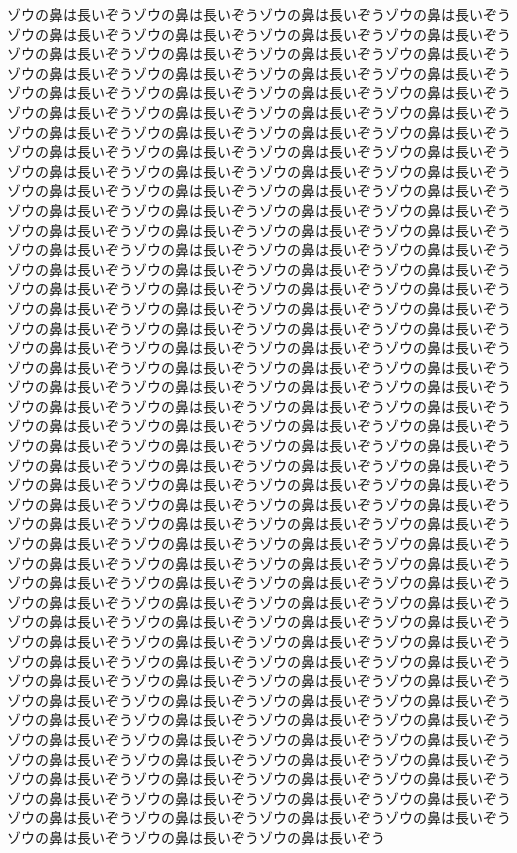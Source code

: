 ゾウの鼻は長いぞうゾウの鼻は長いぞうゾウの鼻は長いぞうゾウの鼻は長いぞうゾウの鼻は長いぞうゾウの鼻は長いぞうゾウの鼻は長いぞうゾウの鼻は長いぞうゾウの鼻は長いぞうゾウの鼻は長いぞうゾウの鼻は長いぞうゾウの鼻は長いぞうゾウの鼻は長いぞうゾウの鼻は長いぞうゾウの鼻は長いぞうゾウの鼻は長いぞうゾウの鼻は長いぞうゾウの鼻は長いぞうゾウの鼻は長いぞうゾウの鼻は長いぞうゾウの鼻は長いぞうゾウの鼻は長いぞうゾウの鼻は長いぞうゾウの鼻は長いぞうゾウの鼻は長いぞうゾウの鼻は長いぞうゾウの鼻は長いぞうゾウの鼻は長いぞうゾウの鼻は長いぞうゾウの鼻は長いぞうゾウの鼻は長いぞうゾウの鼻は長いぞうゾウの鼻は長いぞうゾウの鼻は長いぞうゾウの鼻は長いぞうゾウの鼻は長いぞうゾウの鼻は長いぞうゾウの鼻は長いぞうゾウの鼻は長いぞうゾウの鼻は長いぞうゾウの鼻は長いぞうゾウの鼻は長いぞうゾウの鼻は長いぞうゾウの鼻は長いぞうゾウの鼻は長いぞうゾウの鼻は長いぞうゾウの鼻は長いぞうゾウの鼻は長いぞうゾウの鼻は長いぞうゾウの鼻は長いぞうゾウの鼻は長いぞうゾウの鼻は長いぞうゾウの鼻は長いぞうゾウの鼻は長いぞうゾウの鼻は長いぞうゾウの鼻は長いぞうゾウの鼻は長いぞうゾウの鼻は長いぞうゾウの鼻は長いぞうゾウの鼻は長いぞうゾウの鼻は長いぞうゾウの鼻は長いぞうゾウの鼻は長いぞうゾウの鼻は長いぞうゾウの鼻は長いぞうゾウの鼻は長いぞうゾウの鼻は長いぞうゾウの鼻は長いぞうゾウの鼻は長いぞうゾウの鼻は長いぞうゾウの鼻は長いぞうゾウの鼻は長いぞうゾウの鼻は長いぞうゾウの鼻は長いぞうゾウの鼻は長いぞうゾウの鼻は長いぞうゾウの鼻は長いぞうゾウの鼻は長いぞうゾウの鼻は長いぞうゾウの鼻は長いぞうゾウの鼻は長いぞうゾウの鼻は長いぞうゾウの鼻は長いぞうゾウの鼻は長いぞうゾウの鼻は長いぞうゾウの鼻は長いぞうゾウの鼻は長いぞうゾウの鼻は長いぞうゾウの鼻は長いぞうゾウの鼻は長いぞうゾウの鼻は長いぞうゾウの鼻は長いぞうゾウの鼻は長いぞうゾウの鼻は長いぞうゾウの鼻は長いぞうゾウの鼻は長いぞうゾウの鼻は長いぞうゾウの鼻は長いぞうゾウの鼻は長いぞうゾウの鼻は長いぞうゾウの鼻は長いぞうゾウの鼻は長いぞうゾウの鼻は長いぞうゾウの鼻は長いぞうゾウの鼻は長いぞうゾウの鼻は長いぞうゾウの鼻は長いぞうゾウの鼻は長いぞうゾウの鼻は長いぞうゾウの鼻は長いぞうゾウの鼻は長いぞうゾウの鼻は長いぞうゾウの鼻は長いぞうゾウの鼻は長いぞうゾウの鼻は長いぞうゾウの鼻は長いぞうゾウの鼻は長いぞうゾウの鼻は長いぞうゾウの鼻は長いぞうゾウの鼻は長いぞうゾウの鼻は長いぞうゾウの鼻は長いぞうゾウの鼻は長いぞうゾウの鼻は長いぞうゾウの鼻は長いぞうゾウの鼻は長いぞうゾウの鼻は長いぞうゾウの鼻は長いぞうゾウの鼻は長いぞうゾウの鼻は長いぞうゾウの鼻は長いぞうゾウの鼻は長いぞうゾウの鼻は長いぞうゾウの鼻は長いぞうゾウの鼻は長いぞうゾウの鼻は長いぞうゾウの鼻は長いぞうゾウの鼻は長いぞうゾウの鼻は長いぞうゾウの鼻は長いぞうゾウの鼻は長いぞうゾウの鼻は長いぞうゾウの鼻は長いぞうゾウの鼻は長いぞうゾウの鼻は長いぞうゾウの鼻は長いぞうゾウの鼻は長いぞうゾウの鼻は長いぞうゾウの鼻は長いぞうゾウの鼻は長いぞうゾウの鼻は長いぞうゾウの鼻は長いぞうゾウの鼻は長いぞうゾウの鼻は長いぞうゾウの鼻は長いぞうゾウの鼻は長いぞうゾウの鼻は長いぞうゾウの鼻は長いぞうゾウの鼻は長いぞうゾウの鼻は長いぞうゾウの鼻は長いぞうゾウの鼻は長いぞうゾウの鼻は長いぞうゾウの鼻は長いぞうゾウの鼻は長いぞうゾウの鼻は長いぞうゾウの鼻は長いぞうゾウの鼻は長いぞうゾウの鼻は長いぞうゾウの鼻は長いぞうゾウの鼻は長いぞう
